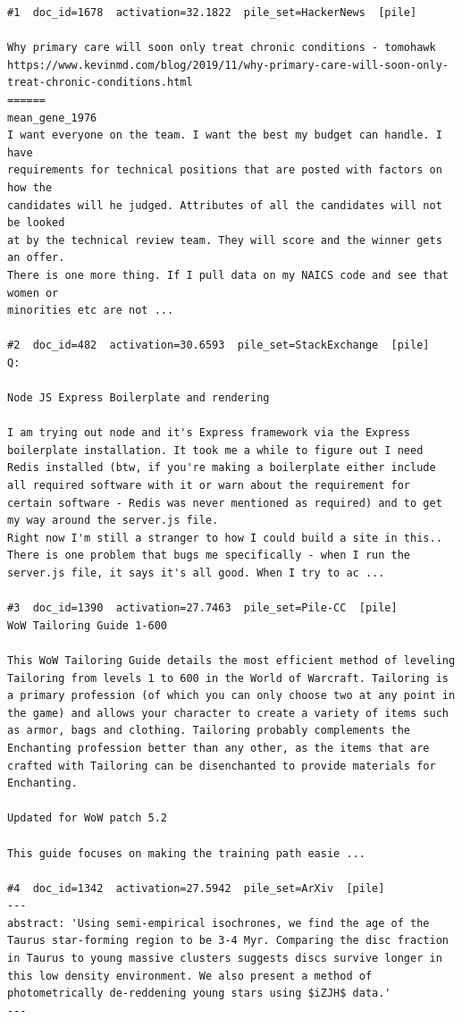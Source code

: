 \begin{verbatim}
#1  doc_id=1678  activation=32.1822  pile_set=HackerNews  [pile]

Why primary care will soon only treat chronic conditions - tomohawk
https://www.kevinmd.com/blog/2019/11/why-primary-care-will-soon-only-treat-chronic-conditions.html
======
mean_gene_1976
I want everyone on the team. I want the best my budget can handle. I have
requirements for technical positions that are posted with factors on how the
candidates will he judged. Attributes of all the candidates will not be looked
at by the technical review team. They will score and the winner gets an offer.
There is one more thing. If I pull data on my NAICS code and see that women or
minorities etc are not ...

#2  doc_id=482  activation=30.6593  pile_set=StackExchange  [pile]
Q:

Node JS Express Boilerplate and rendering

I am trying out node and it's Express framework via the Express boilerplate installation. It took me a while to figure out I need Redis installed (btw, if you're making a boilerplate either include all required software with it or warn about the requirement for certain software - Redis was never mentioned as required) and to get my way around the server.js file.
Right now I'm still a stranger to how I could build a site in this..
There is one problem that bugs me specifically - when I run the server.js file, it says it's all good. When I try to ac ...

#3  doc_id=1390  activation=27.7463  pile_set=Pile-CC  [pile]
WoW Tailoring Guide 1-600

This WoW Tailoring Guide details the most efficient method of leveling Tailoring from levels 1 to 600 in the World of Warcraft. Tailoring is a primary profession (of which you can only choose two at any point in the game) and allows your character to create a variety of items such as armor, bags and clothing. Tailoring probably complements the Enchanting profession better than any other, as the items that are crafted with Tailoring can be disenchanted to provide materials for Enchanting.

Updated for WoW patch 5.2

This guide focuses on making the training path easie ...

#4  doc_id=1342  activation=27.5942  pile_set=ArXiv  [pile]
---
abstract: 'Using semi-empirical isochrones, we find the age of the Taurus star-forming region to be 3-4 Myr. Comparing the disc fraction in Taurus to young massive clusters suggests discs survive longer in this low density environment. We also present a method of photometrically de-reddening young stars using $iZJH$ data.'
---


\end{verbatim}
